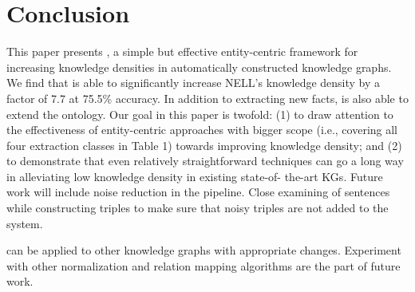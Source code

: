 \section{Conclusion}
\label{sec:conclusion}

This paper presents \system{}, a simple but effective entity-centric framework for increasing knowledge densities in automatically constructed knowledge graphs. We find that \system{} is able to significantly increase NELL's knowledge density by a factor of 7.7 at 75.5\% accuracy. In addition to extracting new facts, \system{} is also able to extend the ontology. Our goal in this paper is twofold: (1) to draw attention to the effectiveness of entity-centric approaches with bigger scope (i.e., covering all four extraction classes in Table 1) towards improving knowledge density; and (2) to demonstrate that even relatively straightforward techniques can go a long way in alleviating low knowledge density in existing state-of- the-art KGs. 
Future work will include noise reduction in the pipeline. Close examining of sentences while constructing triples to make sure that noisy triples are not added to the system.

\system{} can be applied to other knowledge graphs with appropriate changes. Experiment with other normalization and relation mapping algorithms are the part of future work.

